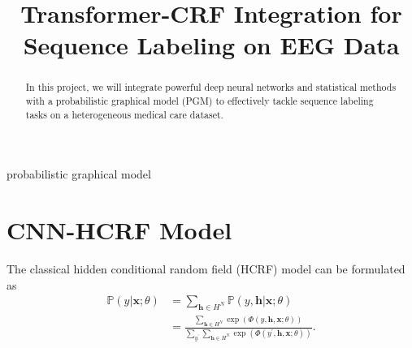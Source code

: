 \documentclass[conference]{IEEEtran}
\newcommand{\PP}{{\mathbb{P}}}
\newcommand{\hb}{\mathbf{h}}
\newcommand{\xb}{\mathbf{x}}
\begin{document}
\title{\LARGE Transformer-CRF Integration for Sequence Labeling on EEG Data}

\author{
\and
{}
\and
{}
}

\maketitle


\begin{abstract}


In this project, we will integrate powerful deep neural networks and
statistical methods with a probabilistic graphical model (PGM) to effectively
tackle sequence labeling tasks on a heterogeneous medical care dataset.


\end{abstract}


\begin{IEEEkeywords}


probabilistic graphical model


\end{IEEEkeywords}


\section{CNN-HCRF Model}

The classical hidden conditional random field (HCRF) model can be formulated as
\begin{equation}
\begin{split}
\PP(y \vert \xb; \theta) &= \sum_{\hb \in H^N}
\mathbb{P}(y, \hb \vert \xb; \theta) \\
&= \frac{\sum_{\hb \in H^N} \exp\left(\Phi(y, \hb, \xb; \theta)\right)}
{\sum_{y^\prime} \sum_{\hb \in H^N}
\exp\left(\Phi(y^\prime, \hb, \xb; \theta)\right)}.
\end{split}
\end{equation}
\end{document}
